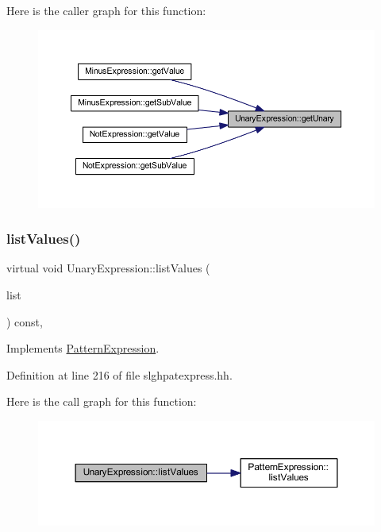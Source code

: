 Here is the caller graph for this function\+:
\nopagebreak
\begin{figure}[H]
\begin{center}
\leavevmode
\includegraphics[width=350pt]{class_unary_expression_aa24bf2ae1eb73a512af77b740d00ab75_icgraph}
\end{center}
\end{figure}
\mbox{\label{class_unary_expression_aaa8a88353176bec87fb6afd24bdd80c2}} 
\subsubsection{\texorpdfstring{listValues()}{listValues()}}
{\footnotesize\ttfamily virtual void Unary\+Expression\+::list\+Values (\begin{DoxyParamCaption}\item[{vector$<$ const \mbox{\hyperlink{class_pattern_value}{Pattern\+Value}} $\ast$ $>$ \&}]{list }\end{DoxyParamCaption}) const\hspace{0.3cm}{\ttfamily [inline]}, {\ttfamily [virtual]}}



Implements \mbox{\hyperlink{class_pattern_expression_a48d1a8fce687ba5c272b2e0d72760363}{Pattern\+Expression}}.



Definition at line 216 of file slghpatexpress.\+hh.

Here is the call graph for this function\+:
\nopagebreak
\begin{figure}[H]
\begin{center}
\leavevmode
\includegraphics[width=350pt]{class_unary_expression_aaa8a88353176bec87fb6afd24bdd80c2_cgraph}
\end{center}
\end{figure}
\mbox{\label{class_unary_expression_ab9b25fcf136b758b13a4cbdcc401db69}} 
